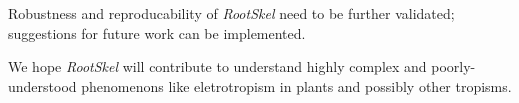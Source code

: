 Robustness and reproducability of \textit{RootSkel} need to be further validated; suggestions for future work can be implemented. 

We hope \textit{RootSkel} will contribute to understand highly complex and poorly-understood phenomenons like eletrotropism in plants and possibly other tropisms. %

%




